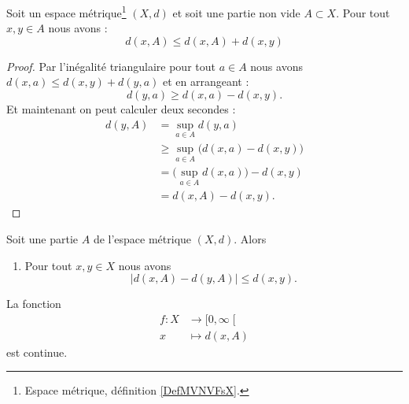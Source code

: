 \begin{proposition}	\label{PROPooTXYMooDGnfKB}
	Soit un espace métrique\footnote{Espace métrique, définition \ref{DefMVNVFsX}.} \( (X,d)\) et soit une partie non vide \( A\subset X\). Pour tout \( x,y\in A\) nous avons :
	\begin{equation}
		d(x,A)\leq d(x,A)+d(x,y)
	\end{equation}
\end{proposition}

\begin{proof}
	Par l'inégalité triangulaire pour tout \( a\in A\) nous avons \( d(x,a)\leq d(x,y)+d(y,a)\) et en arrangeant :
	\begin{equation}
		d(y,a)\geq d(x,a)-d(x,y).
	\end{equation}
	Et maintenant on peut calculer deux secondes :
	\begin{subequations}
		\begin{align}
			d(y,A) & =\sup_{a\in A}d(y,a)                        \\
			       & \geq \sup_{a\in A}\big( d(x,a)- d(x,y)\big) \\
			       & =\big( \sup_{a\in A}d(x,a) \big)-d(x,y)     \\
			       & =d(x,A)-d(x,y).
		\end{align}
	\end{subequations}
\end{proof}


\begin{lemma}        \label{LEMooCFGTooIfdcfk}
	Soit une partie \( A\) de l'espace métrique \( (X,d)\). Alors
	\begin{enumerate}
		\item		\label{ITEMooDXSHooPhCXlR}
		      Pour tout \( x,y\in X\) nous avons
		      \begin{equation}
			      | d(x,A)-d(y,A) |\leq d(x,y).
		      \end{equation}
	\end{enumerate}

	\item		\label{ITEMooGNSEooDVZrFp}
	La fonction
	\begin{equation}
		\begin{aligned}
			f\colon X & \to \mathopen[ 0 , \infty \mathclose[ \\
			x         & \mapsto d(x,A)
		\end{aligned}
	\end{equation}
	est continue.
\end{lemma}

